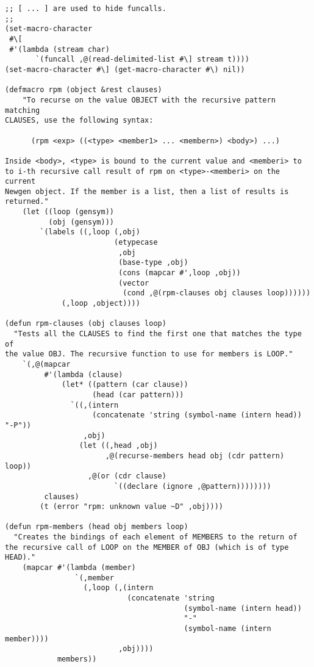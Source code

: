 \begin{sloppypar}
\begin{verbatim}
;; [ ... ] are used to hide funcalls.
;;
(set-macro-character
 #\[
 #'(lambda (stream char)
       `(funcall ,@(read-delimited-list #\] stream t))))
(set-macro-character #\] (get-macro-character #\) nil))

(defmacro rpm (object &rest clauses)
    "To recurse on the value OBJECT with the recursive pattern matching
CLAUSES, use the following syntax:

      (rpm <exp> ((<type> <member1> ... <membern>) <body>) ...)

Inside <body>, <type> is bound to the current value and <memberi> to
to i-th recursive call result of rpm on <type>-<memberi> on the current
Newgen object. If the member is a list, then a list of results is
returned."
    (let ((loop (gensym))
          (obj (gensym)))
        `(labels ((,loop (,obj)
                         (etypecase
                          ,obj
                          (base-type ,obj)
                          (cons (mapcar #',loop ,obj))
                          (vector
                           (cond ,@(rpm-clauses obj clauses loop))))))
             (,loop ,object))))

(defun rpm-clauses (obj clauses loop)
  "Tests all the CLAUSES to find the first one that matches the type of
the value OBJ. The recursive function to use for members is LOOP."
    `(,@(mapcar 
         #'(lambda (clause)
             (let* ((pattern (car clause))
                    (head (car pattern)))
               `((,(intern 
                    (concatenate 'string (symbol-name (intern head)) "-P"))
                  ,obj)
                 (let ((,head ,obj)
                       ,@(recurse-members head obj (cdr pattern) loop))
                   ,@(or (cdr clause)
                         `((declare (ignore ,@pattern))))))))
         clauses)
        (t (error "rpm: unknown value ~D" ,obj))))

(defun rpm-members (head obj members loop)
  "Creates the bindings of each element of MEMBERS to the return of
the recursive call of LOOP on the MEMBER of OBJ (which is of type HEAD)."
    (mapcar #'(lambda (member)
                `(,member
                  (,loop (,(intern 
                            (concatenate 'string
                                         (symbol-name (intern head))
                                         "-"
                                         (symbol-name (intern member))))
                          ,obj))))
            members))
\end{verbatim}


\end{sloppypar}
